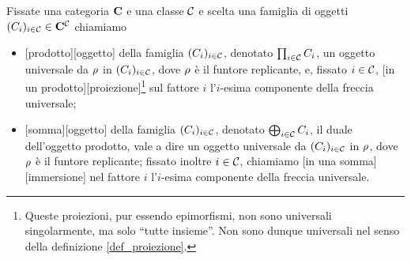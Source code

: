 \begin{Definition}
	Fissate una categoria $\mathbf{C}$ e una classe $\mathcal{C}$ e scelta una famiglia di oggetti $(C_i)_{i \in \mathcal{C}} \in \mathbf{C}^{\mathcal{C}}$ chiamiamo
	\begin{itemize}
		\item {}[prodotto][oggetto] della famiglia $(C_i)_{i \in \mathcal{C}}$, denotato $\prod_{i \in \mathcal{C}} C_i$, un oggetto universale da $\rho$ in $(C_i)_{i \in \mathcal{C}}$, dove $\rho$ \`e il funtore replicante, e, fissato $i \in \mathcal{C}$, [in un prodotto][proiezione]\footnote{Queste proiezioni, pur essendo epimorfismi, non sono universali singolarmente, ma solo ``tutte insieme''. Non sono dunque universali nel senso della definizione \ref{def_proiezione}.} sul fattore $i$ l'$i$-esima componente della freccia universale;
		\item {}[somma][oggetto] della famiglia $(C_i)_{i \in \mathcal{C}}$, denotato $\bigoplus_{i \in \mathcal{C}} C_i$, il duale dell'oggetto prodotto, vale a dire un oggetto universale da $(C_i)_{i \in \mathcal{C}}$ in $\rho$, dove $\rho$ \`e il funtore replicante; fissato inoltre $i \in \mathcal{C}$, chiamiamo [in una somma][immersione] nel fattore $i$ l'$i$-esima componente della freccia universale.
	\end{itemize}
\end{Definition}
